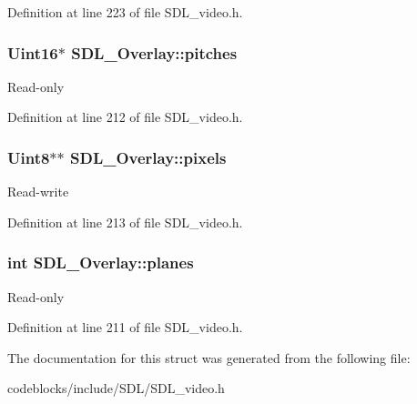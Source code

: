 Definition at line 223 of file S\+D\+L\+\_\+video.\+h.

\hypertarget{structSDL__Overlay_ad88bb773013ff535c647af38760c69e8}{
\subsubsection[{pitches}]{\setlength{\rightskip}{0pt plus 5cm}Uint16$\ast$ S\+D\+L\+\_\+\+Overlay\+::pitches}}\label{structSDL__Overlay_ad88bb773013ff535c647af38760c69e8}
Read-\/only 

Definition at line 212 of file S\+D\+L\+\_\+video.\+h.

\hypertarget{structSDL__Overlay_a782b8904e618e8a1c2c8299c3994ec8f}{
\subsubsection[{pixels}]{\setlength{\rightskip}{0pt plus 5cm}Uint8$\ast$$\ast$ S\+D\+L\+\_\+\+Overlay\+::pixels}}\label{structSDL__Overlay_a782b8904e618e8a1c2c8299c3994ec8f}
Read-\/write 

Definition at line 213 of file S\+D\+L\+\_\+video.\+h.

\hypertarget{structSDL__Overlay_ab91d676ef6310197aa189c469be3d50a}{
\subsubsection[{planes}]{\setlength{\rightskip}{0pt plus 5cm}int S\+D\+L\+\_\+\+Overlay\+::planes}}\label{structSDL__Overlay_ab91d676ef6310197aa189c469be3d50a}
Read-\/only 

Definition at line 211 of file S\+D\+L\+\_\+video.\+h.



The documentation for this struct was generated from the following file\+:\begin{DoxyCompactItemize}
\item 
codeblocks/include/\+S\+D\+L/S\+D\+L\+\_\+video.\+h\end{DoxyCompactItemize}

